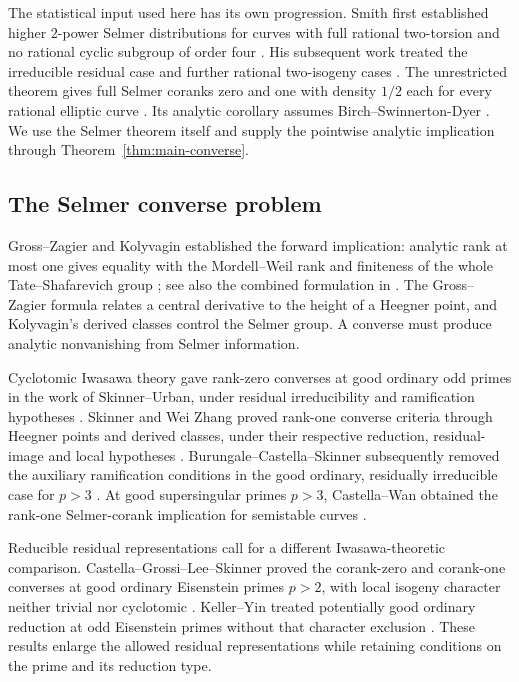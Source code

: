 The statistical input used here has its own progression.
Smith first established higher $2$-power Selmer distributions for curves
with full rational two-torsion and no rational cyclic subgroup of order
four \citep{Smith2017}. His subsequent work treated the irreducible
residual case and further rational two-isogeny cases
\citep{SmithDistributionI,SmithDistributionII}.
The unrestricted theorem gives full Selmer coranks zero and one with
density $1/2$ each for every rational elliptic curve
\citep[Theorem~1.1]{Smith2025}. Its analytic corollary assumes
Birch--Swinnerton-Dyer \citep[Corollary~1.2]{Smith2025}.
We use the Selmer theorem itself and supply the pointwise analytic
implication through Theorem~\ref{thm:main-converse}.

\subsection{The Selmer converse problem}

Gross--Zagier and Kolyvagin established the forward implication:
analytic rank at most one gives equality with the Mordell--Weil rank
and finiteness of the whole Tate--Shafarevich group
\citep{GrossZagier1986,Kolyvagin1990}; see also the combined formulation
in \citet[\S1]{Skinner2020}.
The Gross--Zagier formula relates a central derivative to the height
of a Heegner point, and Kolyvagin's derived classes control the Selmer
group. A converse must produce analytic nonvanishing from Selmer
information.

Cyclotomic Iwasawa theory gave rank-zero converses at good ordinary
odd primes in the work of Skinner--Urban, under residual
irreducibility and ramification hypotheses
\citep{SkinnerUrban2014}.
Skinner and Wei Zhang proved rank-one converse criteria through
Heegner points and derived classes, under their respective reduction,
residual-image and local hypotheses \citep{Skinner2020,Zhang2014}.
Burungale--Castella--Skinner subsequently removed the auxiliary
ramification conditions in the good ordinary, residually irreducible
case for $p>3$ \citep[Theorem~1.2.2 and the discussion following
Remark~1.2.3]{BurungaleCastellaSkinner2025}.
At good supersingular primes $p>3$, Castella--Wan obtained the rank-one
Selmer-corank implication for semistable curves
\citep[Theorem~A]{CastellaWan2024}.

Reducible residual representations call for a different Iwasawa-theoretic
comparison. Castella--Grossi--Lee--Skinner proved the corank-zero and
corank-one converses at good ordinary Eisenstein primes $p>2$, with
local isogeny character neither trivial nor cyclotomic
\citep[Theorem~E]{CastellaGrossiLeeSkinner2022}.
Keller--Yin treated potentially good ordinary reduction at odd
Eisenstein primes without that character exclusion
\citep[Theorem~B]{KellerYin2024}.
These results enlarge the allowed residual representations while
retaining conditions on the prime and its reduction type.

